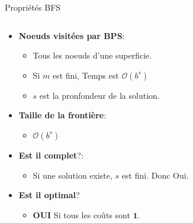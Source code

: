 \documentclass{beamer}
\begin{document}
\begin{frame}[t]{Propriétés BFS}

 \begin{columns}
   \begin{column}{0.5\textwidth}
     \begin{itemize}
       \small
     \item \textbf{Noeuds visitées par BPS}:
         \begin{itemize}
         \scriptsize
       \item Tous les noeuds d'une superficie.
       \item Si $m$ est fini, Temps est \alert{$\mathcal{O}(b^s)$} 
       \item \alert{$s$} est la pronfondeur de la solution.
         \end{itemize}
       \item \textbf{Taille de la frontière}:
         \begin{itemize}
           \scriptsize
         \item<2-> \alert{$\mathcal{O}(b^s)$}
         \end{itemize}

       \item \textbf{Est il complet}?:
           \begin{itemize}
             \scriptsize
           \item Si une solution existe, $s$ est fini. Donc \alert{Oui}.
           \end{itemize}
         \item \textbf{Est il optimal}?
            \begin{itemize}
              \scriptsize
            \item \textbf{\alert{OUI}} Si tous les coûts sont $\mathbf{1}$.
            \end{itemize}
     \end{itemize}
   \end{column}
   \begin{column}{0.5\textwidth}
     \begin{figure}[htpb]
     \begin{center}
\end{center}
\end{figure}
\end{column}
\end{columns}
\end{frame}
\end{document}
